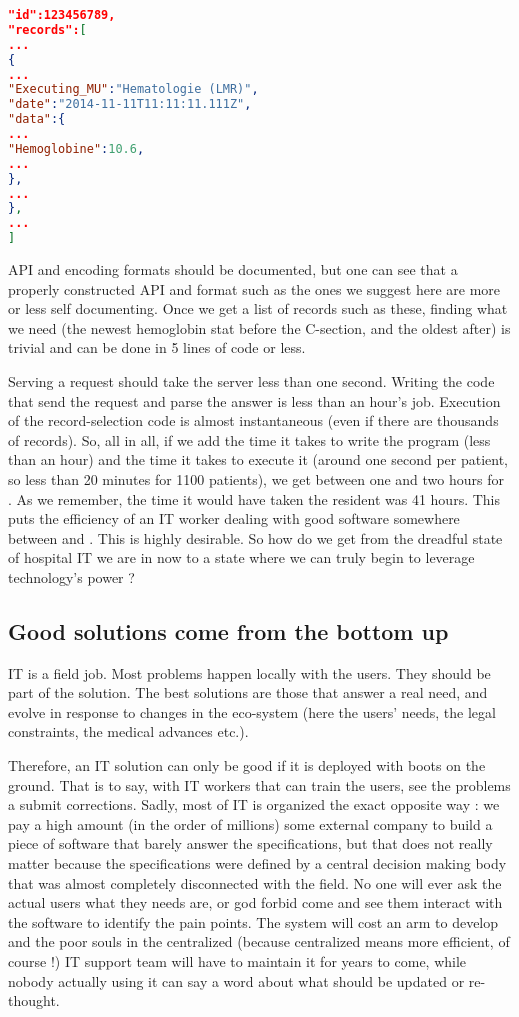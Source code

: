 \documentclass[nobib]{tufte-handout}
\begin{document}
\begin{lstlisting}[language=json,firstnumber=1]
"id":123456789,
"records":[
...
{
...
"Executing_MU":"Hematologie (LMR)",
"date":"2014-11-11T11:11:11.111Z",
"data":{
...
"Hemoglobine":10.6,
...
},
...
},
...
]
\end{lstlisting}

API and encoding formats should be documented, but one can see that a properly constructed API and format such as the ones we suggest here are more or less self documenting. Once we get a list of records such as these, finding what we need (the newest hemoglobin stat before the C-section, and the oldest after) is trivial and can be done in 5 lines of code or less.

Serving a request should take the server less than one second. Writing the code that send the request and parse the answer is less than an hour's job. Execution of the record-selection code is almost instantaneous (even if there are thousands of records). So, all in all, if we add the time it takes to write the program (less than an hour) and the time it takes to execute it (around one second per patient, so less than 20 minutes for 1100 patients), we get between one and two hours for . As we remember, the time it would have taken the resident was 41 hours. This puts the efficiency  of an IT worker dealing with good software somewhere between  and . This is highly desirable. So how do we get from the dreadful state of hospital IT we are in now to a state where we can truly begin to leverage technology's power ?

\subsection{Good solutions come from the bottom up}
\label{sec:good}

IT is a field job. Most problems happen locally with the users. They should be part of the solution. The best solutions are those that answer a real need, and evolve in response to changes in the eco-system (here the users' needs, the legal constraints, the medical advances etc.).

Therefore, an IT solution can only be good if it is deployed with boots on the ground. That is to say, with IT workers that can train the users, see the problems a submit corrections. Sadly, most of IT is organized the exact opposite way : we pay a high amount (in the order of millions) some external company to build a piece of software that barely answer the specifications, but that does not really matter because the specifications were defined by a central decision making body that was almost completely disconnected with the field. No one will ever ask the actual users what they needs are, or god forbid come and see them interact with the software to identify the pain points. The system will cost an arm to develop and the poor souls in the centralized (because centralized means more efficient, of course !) IT support team will have to maintain it for years to come, while nobody actually using it can say a word about what should be updated or re-thought.
\end{document}
